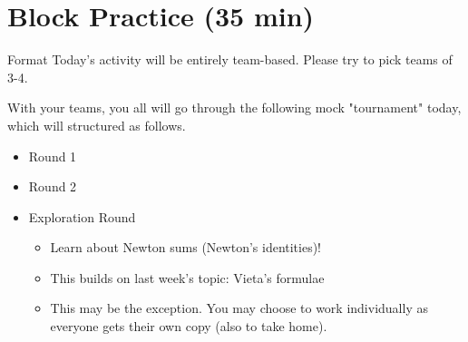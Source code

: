 \documentclass[aspectratio=169,xcolor=dvipsnames]{beamer}
\begin{document}
% 
% 

\section{Block Practice (35 min)}

\begin{frame}[t]{Format}
    Today's activity will be entirely team-based\textsuperscript{\textdagger}. Please try to pick teams of 3-4. 
    
    \vspace{1em}
    
    With your teams, you all will go through the following mock "tournament" today, which will structured as follows.
    \vspace{1.5em}
    \begin{itemize}
        \setlength\itemsep{1em}
        \item Round 1
        \item Round 2
        \item Exploration Round
        \begin{itemize}
            \item Learn about Newton sums (Newton's identities)! 
            \item This builds on last week's topic: Vieta's formulae
            \item \textsuperscript{\textdagger}This may be the exception. You may choose to work individually as everyone gets their own copy (also to take home).
        \end{itemize}
    \end{itemize}
\end{frame}
\end{document}
